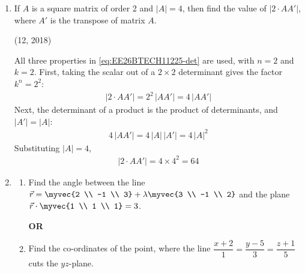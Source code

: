 \begin{enumerate}[label=\thesubsection.\arabic*, ref=\thesubsection.\theenumi]

    \item If $A$ is a square matrix of order 2 and $|A| = 4$, then find the value of $|2 \cdot AA'|$, where $A'$ is the transpose of matrix $A$.
\par\hfill (12, 2018)\par
\solution All three properties in \eqref{eq:EE26BTECH11225-det} are used, with $n = 2$ and $k = 2$. First, taking the scalar out of a $2 \times 2$ determinant gives the factor $k^n = 2^2$:
\begin{align*}
|2 \cdot AA'| = 2^2\,|AA'| = 4\,|AA'|
\end{align*}
Next, the determinant of a product is the product of determinants, and $|A'| = |A|$:
\begin{align*}
4\,|AA'| = 4\,|A|\,|A'| = 4\,|A|^2
\end{align*}
Substituting $|A| = 4$,
\begin{align}
|2 \cdot AA'| = 4 \times 4^2 = \boxed{64}
\end{align}
    \item
    \begin{enumerate}[label=(\alph*), leftmargin=1.5em, labelsep=0.5em]
        \item Find the angle between the line $\vec{r} = \myvec{2 \\ -1 \\ 3} + \lambda\myvec{3 \\ -1 \\ 2}$ and the plane $\vec{r}\cdot\myvec{1 \\ 1 \\ 1} = 3$.

        \begin{center}
            \textbf{OR}
        \end{center}

        \item Find the co-ordinates of the point, where the line $\dfrac{x+2}{1} = \dfrac{y-5}{3} = \dfrac{z+1}{5}$ cuts the $yz$-plane.
    \end{enumerate} \vspace{2pt}


\end{enumerate}
